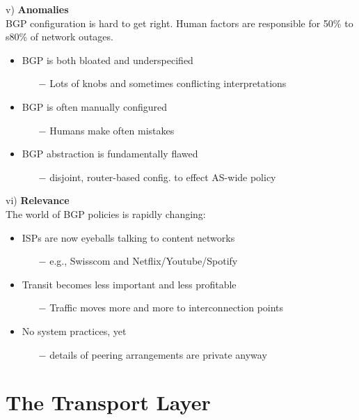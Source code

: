 \documentclass[a4paper, fontsize=8pt, landscape, DIV=1]{scrartcl}
\begin{document}
\begin{multicols*}{4}
		v) \textbf{Anomalies}\\
		BGP configuration is hard to get right. Human factors are responsible for 50\% to s80\% of network outages.
		\begin{itemize}[noitemsep]
			\item BGP is both bloated and underspecified
			\begin{itemize}
				\item[$-$] Lots of knobs and sometimes conflicting interpretations
			\end{itemize}
			\item BGP is often manually configured
			\begin{itemize}
				\item[$-$] Humans make often mistakes
			\end{itemize}
			\item BGP abstraction is fundamentally flawed
			\begin{itemize}
				\item[$-$] disjoint, router-based config. to effect AS-wide policy
			\end{itemize} 
		\end{itemize}
		\par 
		
		vi) \textbf{Relevance}\\
		The world of BGP policies is rapidly changing: 
		\begin{itemize}[noitemsep]
			\item ISPs are now eyeballs talking to content networks
			\begin{itemize}
				\item[$-$] e.g., Swisscom and Netflix/Youtube/Spotify
			\end{itemize}
			\item Transit becomes less important and less profitable
			\begin{itemize}
				\item[$-$] Traffic moves more and more to interconnection points
 			\end{itemize}
 			\item No system practices, yet 
 			\begin{itemize}
 				\item[$-$] details of peering arrangements are private anyway
 			\end{itemize}
		\end{itemize}
		
		\section{The Transport Layer} 

\end{multicols*}
\end{document}
